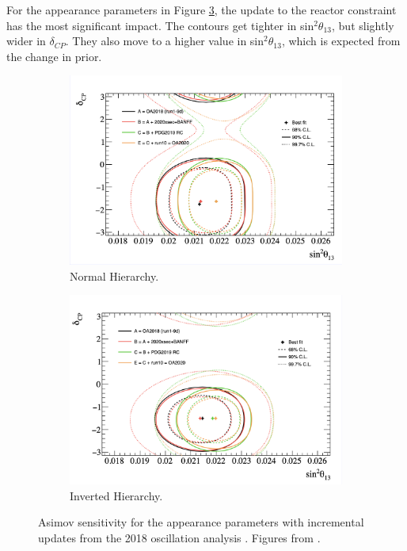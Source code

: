 For the appearance parameters in Figure \ref{fig:20182020AppPT}, the update to the reactor constraint has the most significant impact. The contours get tighter in sin$^2\theta_{13}$, but slightly wider in $\delta_{CP}$. They also move to a higher value in sin$^2\theta_{13}$, which is expected from the change in prior.

\begin{figure}[!htbp]
\centering
\begin{subfigure}{.7\textwidth}
  \centering
  \includegraphics[width=0.95\linewidth, trim={0.5mm 0.5mm 0mm 0mm}, clip]{figs/jointPTheta_appNH}
  \caption{Normal Hierarchy.}
  \label{fig:20182020PTAppNH}
\end{subfigure}
\begin{subfigure}{.7\textwidth}
  \centering
  \includegraphics[width=0.95\linewidth, trim={0mm 0mm 0.5mm 0mm}, clip]{figs/jointPTheta_appIH}
  \caption{Inverted Hierarchy.}
  \label{fig:20182020PTAppIH}
\end{subfigure}
\caption{Asimov sensitivity for the appearance parameters with incremental updates from the 2018 oscillation analysis \cite{t2knature}. Figures from \cite{tn397}.}
\label{fig:20182020AppPT}
\end{figure}

